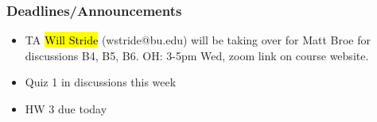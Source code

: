
\begin{frame}
    \frametitle{Deadlines/Announcements}
\begin{itemize}
            \item TA \hl{Will Stride} (wstride@bu.edu) will be taking over for Matt Broe for discussions B4, B5, B6. OH: 3-5pm Wed, zoom link on course website.
            \item Quiz 1 in discussions this week
            \item HW 3 due today
        \end{itemize}
\end{frame}
